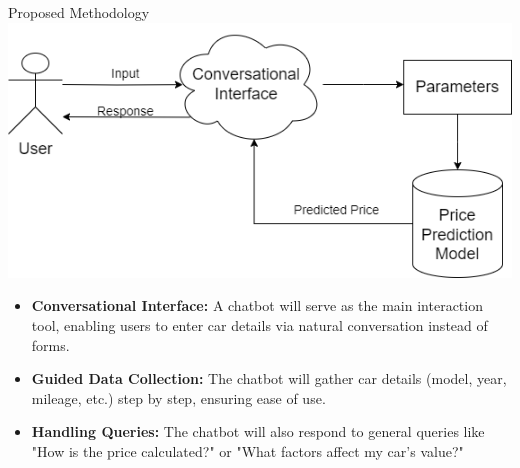 \documentclass{beamer}
\begin{document}
\begin{frame}[t]{Proposed Methodology}
        \centering
        \includegraphics[width=0.7\linewidth]{Proposed.png}  %
    \begin{itemize}
    \item \textbf{Conversational Interface:} A chatbot will serve as the main interaction tool, enabling users to enter car details via natural conversation instead of forms.
    
    \item \textbf{Guided Data Collection:} The chatbot will gather car details (model, year, mileage, etc.) step by step, ensuring ease of use.
    
    \item \textbf{Handling Queries:} The chatbot will also respond to general queries like "How is the price calculated?" or "What factors affect my car's value?"

    \end{itemize}
\end{frame}
\end{document}
